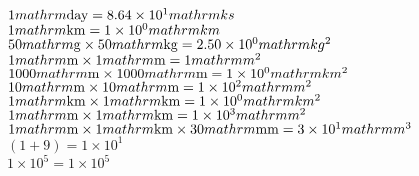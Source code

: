 \documentclass{article}
\begin{document}
\\$1\\mathrm{\mathrm{day}}=8.64\times10^{1}\\mathrm{ks\,}$\\
$1\\mathrm{\mathrm{km}}=1\times10^{0}\\mathrm{km\,}$\\
$50\\mathrm{\mathrm{g}}\times50\\mathrm{\mathrm{kg}}=2.50\times10^{0}\\mathrm{kg^{2}\,}$\\
$1\\mathrm{\mathrm{m}}\times1\\mathrm{\mathrm{m}}=1\\mathrm{m^{2}\,}$\\
$1000\\mathrm{\mathrm{m}}\times1000\\mathrm{\mathrm{m}}=1\times10^{0}\\mathrm{km^{2}\,}$\\
$10\\mathrm{\mathrm{m}}\times10\\mathrm{\mathrm{m}}=1\times10^{2}\\mathrm{m^{2}\,}$\\
$1\\mathrm{\mathrm{km}}\times1\\mathrm{\mathrm{km}}=1\times10^{0}\\mathrm{km^{2}\,}$\\
$1\\mathrm{\mathrm{m}}\times1\\mathrm{\mathrm{km}}=1\times10^{3}\\mathrm{m^{2}\,}$\\
$1\\mathrm{\mathrm{m}}\times1\\mathrm{\mathrm{km}}\times30\\mathrm{\mathrm{mm}}=3\times10^{1}\\mathrm{m^{3}\,}$\\
$(1+9)=1\times10^{1}$\\
$1\times10^{5}=1\times10^{5}$\\
\end{document}
